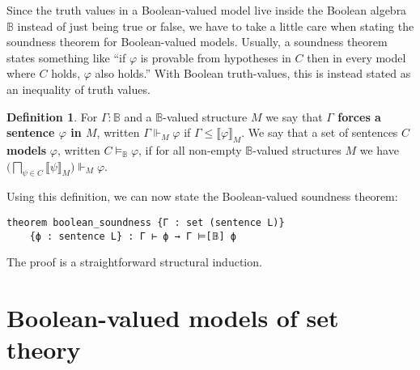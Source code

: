 \documentclass[sigplan,10pt,review, anonymous]{acmart}
\newcommand{\B}{\mathbb{B}}
\theoremstyle{definition}
\newtheorem{defn}{Definition}[section]
\begin{document}
Since the truth values in a Boolean-valued model live inside the Boolean algebra $\B$ instead of just being true or false, we have to take a little care when stating the soundness theorem for Boolean-valued models.
Usually, a soundness theorem states something like ``if $\varphi$ is provable from hypotheses in $C$ then in every model where $C$ holds, $\varphi$ also holds.''
With Boolean truth-values, this is instead stated as an inequality of truth values. %
\begin{defn}
For $\Gamma : \B$ and a $\B$-valued structure $M$ we say that
\textbf{$\Gamma$ forces a sentence $\varphi$ in $M$}, written $\Gamma \Vdash_M \varphi$ if
$\Gamma \le \llbracket \varphi \rrbracket_M$.
We say that a set of sentences $C$ \textbf{models} $\varphi$, written $C \models_{\B}\varphi$, if for all non-empty $\B$-valued structures $M$ we have $\big(\bigsqcap_{\psi\in C}\big \llbracket \psi \rrbracket_M)\Vdash_M \varphi$.
\end{defn}
Using this definition, we can now state the Boolean-valued soundness theorem: \label{boolean-soundness}
\begin{lstlisting}
theorem boolean_soundness {Γ : set (sentence L)}
    {ϕ : sentence L} : Γ ⊢ ϕ → Γ ⊨[𝔹] ϕ
\end{lstlisting}
The proof is a straightforward structural induction.

\section{Boolean-valued models of set theory}
\label{sect:bset}
\end{document}
